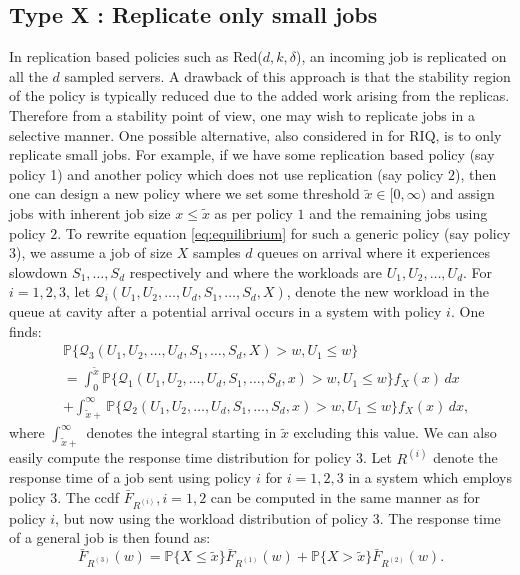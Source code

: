 \documentclass[12pt]{report}
\renewcommand{\P}{\mathbb{P}}
\newcommand{\QQ}{\mathcal{Q}}
\renewcommand{\P}{\mathbb{P}}
\begin{document}
\subsection{Type X : Replicate only small jobs}
In replication based policies such as Red($d,k,\delta$), an incoming job is replicated on all the $d$ sampled servers. A drawback of this approach is that the stability region of the policy is typically reduced due to the added work arising from the replicas. Therefore from a stability point of view, one may wish to replicate jobs in a selective manner. One possible alternative, also considered in
\cite{gardner1} for RIQ, is to only replicate small jobs.
For example, if we have some replication based policy (say policy 1) and another policy which does not use replication (say policy $2$), then one can design a new policy where we set some threshold $\tilde{x}\in[0,\infty)$ and assign jobs with inherent job size $x \leq \tilde{x}$ as per policy $1$ and the remaining jobs using policy $2$.
To rewrite equation \eqref{eq:equilibrium} for such a generic policy (say policy 3), we assume a job of size $X$ samples $d$ queues on arrival where it experiences slowdown $S_1,\dots,S_d$ respectively and where the workloads are $U_1,U_2,\dots,U_d$.
For $i=1,2,3$, let $\QQ_i (U_1,U_2,\dots,U_d,S_1,\dots,S_d,X)$, denote the new workload in the queue at cavity after a potential arrival occurs in a system with policy $i$. One finds:
\begin{align}
&\P\{\QQ_3(U_1,U_2,\dots,U_d,S_1,\dots,S_d,X) > w, U_1 \leq w\} \nonumber
\\
&=\int_0^{\tilde{x}} \P\{\QQ_1(U_1,U_2,\dots,U_d,S_1,\dots,S_d,x) > w, U_1 \leq w\} f_X(x) \, dx \nonumber\\
&+\int_{\tilde{x}+}^\infty \P\{\QQ_2(U_1,U_2,\dots,U_d,S_1,\dots,S_d,x) > w, U_1 \leq w\} f_X(x) \, dx, \label{eq:only_small}
\end{align}
where $\int_{\tilde{x}+}^\infty$ denotes the integral starting in $\tilde{x}$ excluding this value. We can also easily compute the response time distribution for policy 3. Let $R^{(i)}$ denote the response time of a job sent using policy $i$ for $i=1,2,3$ in a system which employs policy $3$. The ccdf $\bar F_{R^{(i)}}, i=1,2$ can be computed in the same manner as for policy $i$, but now using the workload distribution of policy 3. The response time of a general job is then found as:
\begin{equation} \label{eq:Fbar_R_onlysmall}
\bar F_{R^{(3)}}(w)=\P\{X\leq \tilde x\} \bar F_{R^{(1)}}(w) + \P\{X > \tilde x\} \bar F_{R^{(2)}}(w).
\end{equation}
\end{document}
